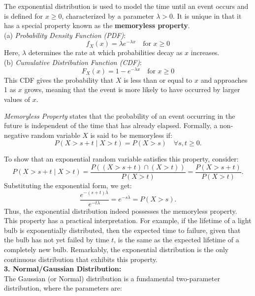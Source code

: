 The exponential distribution is used to model the time until an event occurs and is defined for \(x \geq 0\), characterized by a parameter \(\lambda > 0\). It is unique in that it has a special property known as the \textbf{memoryless property}.\\

(a) \textit{Probability Density Function (PDF)}:
    \[
    f_X(x) = \lambda e^{-\lambda x} \quad \text{for } x \geq 0
    \]
    Here, \(\lambda\) determines the rate at which probabilities decay as \(x\) increases.\\

(b) \textit{Cumulative Distribution Function (CDF)}:
    \[
    F_X(x) = 1 - e^{-\lambda x} \quad \text{for } x \geq 0
    \]
    This CDF gives the probability that \(X\) is less than or equal to \(x\) and approaches 1 as \(x\) grows, meaning that the event is more likely to have occurred by larger values of \(x\).

\begin{definition}
    \textit{Memoryless Property} states that the probability of an event occurring in the future is independent of the time that has already elapsed. Formally, a non-negative random variable \(X\) is said to be memoryless if:
    \[
    P(X > s + t \mid X > t) = P(X > s) \quad \forall s, t \geq 0.
    \]
\end{definition}


To show that an exponential random variable satisfies this property, consider:
\[
P(X > s + t \mid X > t) = \frac{P((X > s + t) \cap (X > t))}{P(X > t)} = \frac{P(X > s + t)}{P(X > t)}.
\]
Substituting the exponential form, we get:
\[
\frac{e^{-(s+t)\lambda}}{e^{-t\lambda}} = e^{-s\lambda} = P(X > s).
\]
Thus, the exponential distribution indeed possesses the memoryless property. \\

This property has a practical interpretation. For example, if the lifetime of a light bulb is exponentially distributed, then the expected time to failure, given that the bulb has not yet failed by time \(t\), is the same as the expected lifetime of a completely new bulb. Remarkably, the exponential distribution is the only continuous distribution that exhibits this property.\\

\textbf{3. Normal/Gaussian Distribution:} \\

The Gaussian (or Normal) distribution is a fundamental two-parameter distribution, where the parameters are:\\

